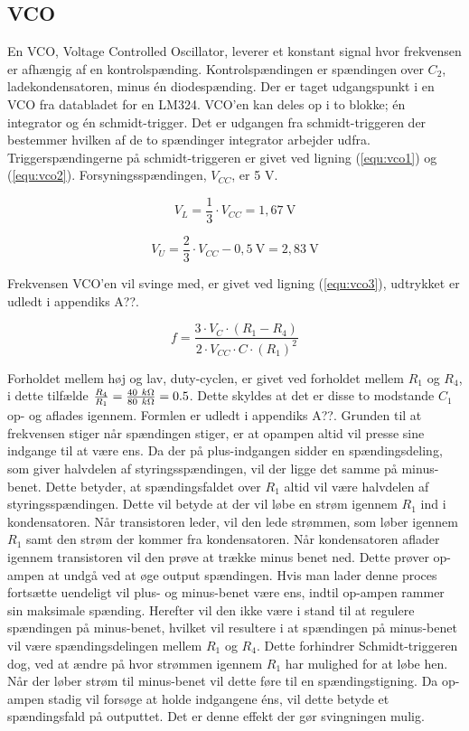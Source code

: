 \subsection*{VCO}
\label{volumenkontrol-design-vco}

En VCO, Voltage Controlled Oscillator, leverer et konstant signal hvor frekvensen er afhængig af en kontrolspænding. Kontrolspændingen er spændingen over $C_2$, ladekondensatoren, minus én diodespænding. Der er taget udgangspunkt i en VCO fra databladet for en LM324. VCO'en kan deles op i to blokke; én integrator og én schmidt-trigger. Det er udgangen fra schmidt-triggeren der bestemmer hvilken af de to spændinger integrator arbejder udfra. Triggerspændingerne på schmidt-triggeren er givet ved ligning (\ref{equ:vco1}) og (\ref{equ:vco2}). Forsyningsspændingen, $V_{CC}$, er 5 V.

\begin{equation}
\label{equ:vco1}
V_L = \frac{1}{3} \cdot V_{CC} = 1,67~\mathrm{V}
\end{equation}

\begin{equation}
\label{equ:vco2}
V_U = \frac{2}{3} \cdot V_{CC} - 0,5~\mathrm{V} = 2,83~\mathrm{V}
\end{equation}

Frekvensen VCO'en vil svinge med, er givet ved ligning (\ref{equ:vco3}), udtrykket er udledt i appendiks A??.

\begin{equation}
\label{equ:vco3}
f = \frac{3 \cdot V_C \cdot (R_1 - R_4)}{2 \cdot V_{CC} \cdot C \cdot (R_1)^2}
\end{equation}

Forholdet mellem høj og lav, duty-cyclen, er givet ved forholdet mellem $R_1$ og $R_4$, i dette tilfælde $\frac{R_4}{R_1} = \frac{40~k\ohm}{80~k\ohm}=0.5$. Dette skyldes at det er disse to modstande $C_1$ op- og aflades igennem. Formlen er udledt i appendiks A??. Grunden til at frekvensen stiger når spændingen stiger, er at opampen altid vil presse sine indgange til at være ens. Da der på plus-indgangen sidder en spændingsdeling, som giver halvdelen af styringsspændingen, vil der ligge det samme på minus-benet. Dette betyder, at spændingsfaldet over $R_1$ altid vil være halvdelen af styringsspændingen. Dette vil betyde at der vil løbe en strøm igennem $R_1$ ind i kondensatoren. Når transistoren leder, vil den lede strømmen, som løber igennem $R_1$ samt den strøm der kommer fra kondensatoren. Når kondensatoren aflader igennem transistoren vil den prøve at trække minus benet ned. Dette prøver op-ampen at undgå ved at øge output spændingen. Hvis man lader denne proces fortsætte uendeligt vil plus- og minus-benet være ens, indtil op-ampen rammer sin maksimale spænding. Herefter vil den ikke være i stand til at regulere spændingen på minus-benet, hvilket vil resultere i at spændingen på minus-benet vil være spændingsdelingen mellem $R_1$ og $R_4$. Dette forhindrer Schmidt-triggeren dog, ved at ændre på hvor strømmen igennem $R_1$ har mulighed for at løbe hen. Når der løber strøm til minus-benet vil dette føre til en spændingstigning. Da op-ampen stadig vil forsøge at holde indgangene éns, vil dette betyde et spændingsfald på outputtet. Det er denne effekt der gør svingningen mulig.


